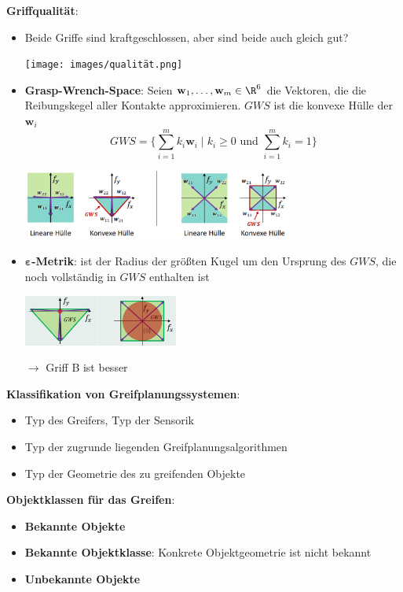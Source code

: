 \bigskip
\textbf{Griffqualität}:
\begin{itemize}
	\item Beide Griffe sind kraftgeschlossen, aber sind beide auch gleich gut?
	\begin{center}
		\texttt{[image: images/qualität.png]}
	\end{center}
	\item \textbf{Grasp-Wrench-Space}: Seien $\mathbf{w}_1,\ldots,\mathbf{w}_m\in\R^6$ die Vektoren, die die Reibungskegel aller Kontakte approximieren. $GWS$ ist die konvexe Hülle der $\mathbf{w}_i$
	$$GWS=\{\sum\limits_{i=1}^{m}k_i\mathbf{w}_i\mid k_i\geq 0 \text{ und } \sum\limits_{i=1}^{m} k_i=1\}$$
	\begin{center}
		\includegraphics[width=0.7\textwidth]{images/gws.png}
	\end{center}
	\item \textbf{$\boldsymbol{\varepsilon}$-Metrik}: ist der Radius der größten Kugel um den Ursprung des $GWS$, die noch vollständig in $GWS$ enthalten ist
	\begin{center}
		\includegraphics[width=0.4\textwidth]{images/epsilon.png}
	\end{center}
	$\rightarrow$ Griff B ist besser
\end{itemize}
\bigskip
\textbf{Klassifikation von Greifplanungssystemen}:
\begin{itemize}
	\item Typ des Greifers, Typ der Sensorik
	\item Typ der zugrunde liegenden Greifplanungsalgorithmen
	\item Typ der Geometrie des zu greifenden Objekte
\end{itemize}
\bigskip
\textbf{Objektklassen für das Greifen}:
\begin{itemize}
	\item \textbf{Bekannte Objekte}
	\item \textbf{Bekannte Objektklasse}: Konkrete Objektgeometrie ist nicht bekannt
	\item \textbf{Unbekannte Objekte}
\end{itemize}
